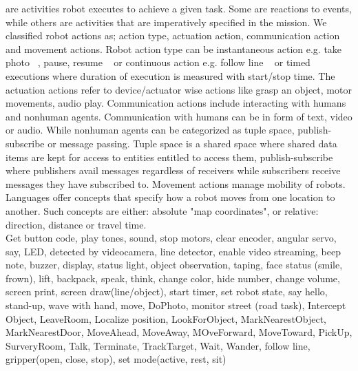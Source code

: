  
 are activities robot executes to achieve a given task. Some are reactions to events, while others are activities that are imperatively specified in the mission. We classified robot actions as; action type, actuation action, communication action and movement actions. Robot action type can be instantaneous action e.g. take photo ~\cite{FLYAQ}, pause, resume ~\cite{PICAXE} or continuous action e.g. follow line ~\cite{LEGO,Sphero} or timed executions where duration of execution is measured with start/stop time. The actuation actions refer to device/actuator wise actions like grasp an object, motor movements, audio play. Communication actions include interacting with humans and nonhuman agents.  Communication with humans can be in form of text, video or audio. While nonhuman agents can  be categorized as tuple space, publish-subscribe or message passing. Tuple space is a shared space where shared data items are kept for access to entities entitled to access them, publish-subscribe where publishers avail messages regardless of receivers while subscribers receive messages they have subscribed to.
Movement actions manage mobility of robots. Languages offer concepts that specify how a robot moves from one location to another. Such  concepts are either: absolute "map coordinates", or relative: direction, distance or travel time.\\
 Get button code, play tones, sound, stop motors, clear encoder, angular servo, say, LED, detected by videocamera, line detector, enable video streaming, beep note, buzzer, display, status light, object observation, taping, face status (smile, frown), lift, backpack, speak, think, change color, hide number, change volume, screen print, screen draw(line/object), start timer, set robot state, say hello, stand-up, wave with hand, move, DoPhoto, monitor street (road task), Intercept Object, LeaveRoom, Localize position, LookForObject, MarkNearestObject, MarkNearestDoor, MoveAhead, MoveAway, MOveForward, MoveToward, PickUp, SurveryRoom, Talk, Terminate, TrackTarget, Wait, Wander, follow line, gripper(open, close, stop), set mode(active, rest, sit)\\
 
